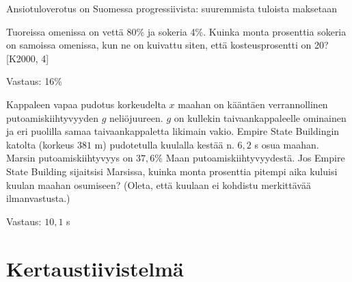 Ansiotuloverotus on Suomessa progressiivista: suuremmista tuloista maksetaan

\begin{tehtava}
Tuoreissa omenissa on vettä 80\% ja sokeria 4\%. Kuinka monta prosenttia sokeria on samoissa omenissa, kun ne on kuivattu siten, että kosteusprosentti on 20? [K2000, 4]
\begin{vastaus}
Vastaus: 16\%
\end{vastaus}
\end{tehtava}

\begin{tehtava}
Kappaleen vapaa pudotus korkeudelta $x$ maahan on kääntäen verrannollinen putoamiskiihtyvyyden $g$ neliöjuureen. $g$ on kullekin taivaankappaleelle ominainen ja eri puolilla samaa taivaankappaletta likimain vakio. Empire State Buildingin katolta (korkeus $381$ m) pudotetulla kuulalla kestää n. $6,2$ s osua maahan. Marsin putoamiskiihtyvyys on $37,6$\%  Maan putoamiskiihtyvyydestä. Jos Empire State Building sijaitsisi Marsissa, kuinka monta prosenttia pitempi aika kuluisi kuulan maahan osumiseen? (Oleta, että kuulaan ei kohdistu merkittävää ilmanvastusta.)
\begin{vastaus}
Vastaus: $10,1$ s
\end{vastaus}
\end{tehtava}

%
%
\chapter{Kertaustiivistelmä}
